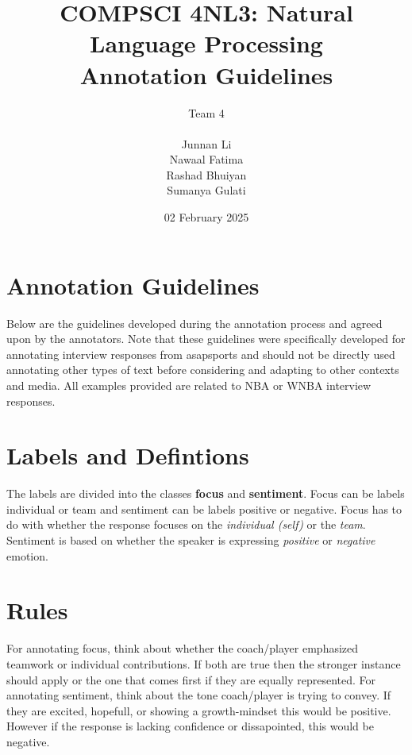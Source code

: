 \documentclass[titlepage]{article}
\title{COMPSCI 4NL3: Natural Language Processing\\
Annotation Guidelines}
\author{Team 4\\
\\ Junnan Li
\\ Nawaal Fatima
\\ Rashad Bhuiyan
\\ Sumanya Gulati}
\date{02 February 2025}
\begin{document}
\begin{titlepage}
  \maketitle
\end{titlepage}

\newpage

\section{Annotation Guidelines}
Below are the guidelines developed during the annotation process and agreed upon 
by the annotators. Note that these guidelines were specifically developed for 
annotating interview responses from asapsports and should not be directly used 
annotating other types of text before considering and adapting to other contexts and media. 
All examples provided are related to NBA or WNBA interview responses.

\section{Labels and Defintions}
The labels are divided into the classes \textbf{focus} and \textbf{sentiment}. Focus can be labels individual or team and sentiment can be labels positive or negative. Focus has to do with whether the response focuses on the \emph{individual (self)} or the \emph{team}. Sentiment is based on whether the speaker is expressing \emph{positive} or \emph{negative} emotion.

\section{Rules}
For annotating focus, think about whether the coach/player emphasized teamwork or individual contributions. If both are true then the stronger instance should apply or the one that comes first if they are equally represented. For annotating sentiment, think about the tone coach/player is trying to convey. If they are excited, hopefull, or showing a growth-mindset this would be positive. However if the response is lacking confidence or dissapointed, this would be negative.
\end{document}
